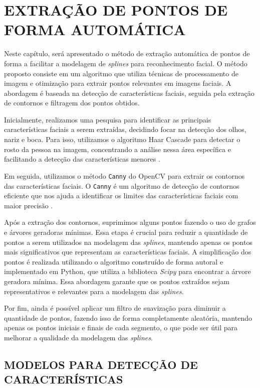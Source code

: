 \chapter{EXTRAÇÃO DE PONTOS DE FORMA AUTOMÁTICA} \label{cha:processamento-imagem} 

Neste capítulo, será apresentado o método de extração automática de pontos de forma a facilitar a modelagem de \textit{splines} para reconhecimento facial. O método proposto consiste em um algoritmo que utiliza técnicas de processamento de imagem e otimização para extrair pontos relevantes em imagens faciais. A abordagem é baseada na detecção de características faciais, seguida pela extração de contornos e filtragem dos pontos obtidos.

Inicialmente, realizamos uma pesquisa para identificar as principais características faciais a serem extraídas, decidindo focar na detecção dos olhos, nariz e boca. Para isso, utilizamos o algoritmo Haar Cascade para detectar o rosto da pessoa na imagem, concentrando a análise nessa área específica e facilitando a detecção das características menores \cite{BoostedCascade}.

Em seguida, utilizamos o método \texttt{Canny} do OpenCV \cite{CannyAplicacao} para extrair os contornos das características faciais. O \texttt{Canny} é um algoritmo de detecção de contornos eficiente que nos ajuda a identificar os limites das características faciais com maior precisão \cite{Canny}.

Após a extração dos contornos, suprimimos alguns pontos fazendo o uso de grafos e árvores geradoras mínimas. Essa etapa é crucial para reduzir a quantidade de pontos a serem utilizados na modelagem das \textit{splines}, mantendo apenas os pontos mais significativos que representam as características faciais. A simplificação dos pontos é realizada utilizando o algoritmo construído de forma autoral e implementado em Python, que utiliza a biblioteca \textit{Scipy} \cite{Scipy} para encontrar a árvore geradora mínima. Essa abordagem garante que os pontos extraídos sejam representativos e relevantes para a modelagem das \textit{splines}.

Por fim, ainda é possível aplicar um filtro de suavização para diminuir a quantidade de pontos, fazendo isso de forma completamente aleatória, mantendo apenas os pontos iniciais e finais de cada segmento, o que pode ser útil para melhorar a qualidade da modelagem das \textit{splines}.

\section{MODELOS PARA DETECÇÃO DE CARACTERÍSTICAS}

